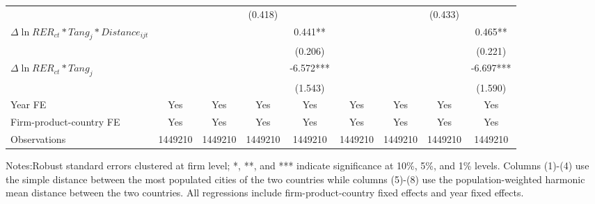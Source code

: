 \begin{table}
{\begin{threeparttable}
\begin{tabular}{lcccccccc}
				&    &       & (0.418) &       &       &       & (0.433) &  \\
				$\Delta \ln RER_{ct}*Tang_{j}*Distance_{ijt}$ &     &       &       & 0.441** &       &       &       & 0.465** \\
				&    &       &       & (0.206) &       &       &       & (0.221) \\
				$\Delta \ln RER_{ct}*Tang_{j}$ &    &       &       & -6.572*** &       &       &       & -6.697*** \\
				&     &       &       & (1.543) &       &       &       & (1.590) \\
                    \midrule
				Year FE  & Yes   & Yes   & Yes   & Yes & Yes   & Yes   & Yes   & Yes\\
				Firm-product-country FE & Yes   & Yes   & Yes   & Yes & Yes   & Yes   & Yes   & Yes\\
				Observations & 1449210 & 1449210 & 1449210 & 1449210 & 1449210 & 1449210 & 1449210 & 1449210\\
				\bottomrule
			\end{tabular}
			\begin{tablenotes}
				\footnotesize
				\item Notes:Robust standard errors clustered at firm level; *, **, and *** indicate significance at 10\%, 5\%, and 1\% levels. Columns (1)-(4) use the simple distance between the most populated cities of the two countries while columns (5)-(8) use the population-weighted harmonic mean distance between the two countries. All regressions include firm-product-country fixed effects and year fixed effects.
			\end{tablenotes}
		\end{threeparttable}
	}
	\label{tab.source.distance}
\end{table}

